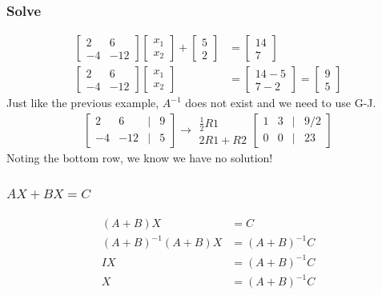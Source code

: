 \documentclass[14pt]{extarticle}
\begin{document}
\subsubsection{Solve}
\begin{align*}
	\begin{bmatrix}	2 & 6 \\ -4 & -12 \end{bmatrix}
	\begin{bmatrix}	x_1 \\	x_2	\end{bmatrix}
	+ \begin{bmatrix} 5 \\ 2 \end{bmatrix}
	&= \begin{bmatrix} 14 \\ 7 \end{bmatrix} \\
	\begin{bmatrix}	2 & 6 \\ -4 & -12 \end{bmatrix}
	\begin{bmatrix}	x_1 \\	x_2	\end{bmatrix}
	&= \begin{bmatrix} 14-5 \\ 7-2 \end{bmatrix}
	= \begin{bmatrix} 9 \\ 5 \end{bmatrix}
\end{align*}
Just like the previous example, $A^{-1}$ does not exist and we need to use G-J.
\begin{align*}
	\begin{bmatrix}	2 & 6 & | & 9 \\
		-4 & -12 & | & 5 \end{bmatrix} \to
	\begin{array}{r}
		\frac{1}{2}R1 \\
		2R1+R2
	\end{array}
	\begin{bmatrix}	1 & 3 & | & 9/2 \\
		0 & 0 & | & 23 \end{bmatrix}
\end{align*}
Noting the bottom row, we know we have no solution!

\subsubsection{$AX + BX =C$}
\begin{align*}
	(A+B)X &=C \\
	(A+B)^{-1}(A+B)X &=(A+B)^{-1}C \\
	IX &=(A+B)^{-1}C \\
	X &=(A+B)^{-1}C
\end{align*}
\end{document}
